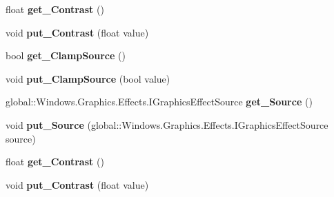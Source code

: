 \begin{DoxyCompactItemize}
float {\bfseries get\+\_\+\+Contrast} ()
\item 
\mbox{\label{interface_microsoft_1_1_graphics_1_1_canvas_1_1_effects_1_1_i_contrast_effect_ac94c08df24985e960695d86aa7d6a379}} 
void {\bfseries put\+\_\+\+Contrast} (float value)
\item 
\mbox{\label{interface_microsoft_1_1_graphics_1_1_canvas_1_1_effects_1_1_i_contrast_effect_a345ed8973aa3787da9976d5c7cf9031d}} 
bool {\bfseries get\+\_\+\+Clamp\+Source} ()
\item 
\mbox{\label{interface_microsoft_1_1_graphics_1_1_canvas_1_1_effects_1_1_i_contrast_effect_ae649f69d06226e09c126ed7788553c83}} 
void {\bfseries put\+\_\+\+Clamp\+Source} (bool value)
\item 
\mbox{\label{interface_microsoft_1_1_graphics_1_1_canvas_1_1_effects_1_1_i_contrast_effect_a98bcd363ec8c58d3079ab2528b82f5e1}} 
global\+::\+Windows.\+Graphics.\+Effects.\+I\+Graphics\+Effect\+Source {\bfseries get\+\_\+\+Source} ()
\item 
\mbox{\label{interface_microsoft_1_1_graphics_1_1_canvas_1_1_effects_1_1_i_contrast_effect_ac1bd8acb3ffbb5750d0523f240810481}} 
void {\bfseries put\+\_\+\+Source} (global\+::\+Windows.\+Graphics.\+Effects.\+I\+Graphics\+Effect\+Source source)
\item 
\mbox{\label{interface_microsoft_1_1_graphics_1_1_canvas_1_1_effects_1_1_i_contrast_effect_a10cb9dcb19b37c752c6823630ac1d388}} 
float {\bfseries get\+\_\+\+Contrast} ()
\item 
\mbox{\label{interface_microsoft_1_1_graphics_1_1_canvas_1_1_effects_1_1_i_contrast_effect_ac94c08df24985e960695d86aa7d6a379}} 
void {\bfseries put\+\_\+\+Contrast} (float value)

\end{DoxyCompactItemize}
